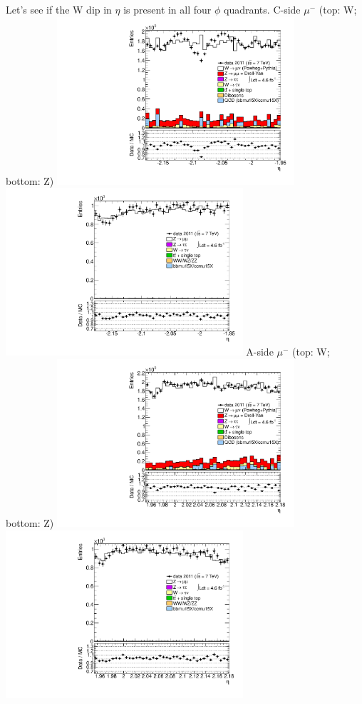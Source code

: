  {
   Let's see if the W dip in $\eta$ is present in all four $\phi$ quadrants.
}
 {
\colb[T]
C-side $\mu^{-}$ (top: W; bottom: Z)
\centering
\includegraphics[width=0.66\textwidth]{dates/20130306/figures/etaphi/WlQ1_10_C_stack_l_eta_NEG} \\
\includegraphics[width=0.66\textwidth]{dates/20130306/figures/etaphi/Z_10_C_stack_lN_eta_ALL.pdf}
A-side $\mu^{-}$ (top: W; bottom: Z)
\centering
\includegraphics[width=0.66\textwidth]{dates/20130306/figures/etaphi/WlQ1_10_A_stack_l_eta_NEG} \\
\includegraphics[width=0.66\textwidth]{dates/20130306/figures/etaphi/Z_10_A_stack_lN_eta_ALL.pdf} 
\cole
} %
